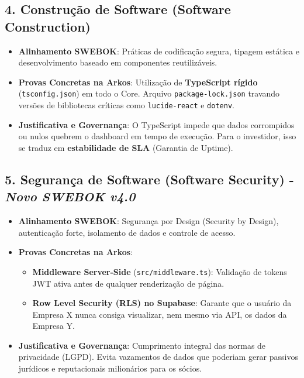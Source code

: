 \subsection{4. Construção de Software (Software Construction)}
\begin{itemize}
    \item \textbf{Alinhamento SWEBOK}: Práticas de codificação segura, tipagem estática e desenvolvimento baseado em componentes reutilizáveis.
    \item \textbf{Provas Concretas na Arkos}: Utilização de \textbf{TypeScript rígido} (\texttt{tsconfig.json}) em todo o Core. Arquivo \texttt{package-lock.json} travando versões de bibliotecas críticas como \texttt{lucide-react} e \texttt{dotenv}.
    \item \textbf{Justificativa e Governança}: O TypeScript impede que dados corrompidos ou nulos quebrem o dashboard em tempo de execução. Para o investidor, isso se traduz em \textbf{estabilidade de SLA} (Garantia de Uptime).
\end{itemize}

\subsection{5. Segurança de Software (Software Security) - \textit{Novo SWEBOK v4.0}}
\begin{itemize}
    \item \textbf{Alinhamento SWEBOK}: Segurança por Design (Security by Design), autenticação forte, isolamento de dados e controle de acesso.
    \item \textbf{Provas Concretas na Arkos}: 
        \begin{itemize}
            \item \textbf{Middleware Server-Side} (\texttt{src/middleware.ts}): Validação de tokens JWT ativa antes de qualquer renderização de página.
            \item \textbf{Row Level Security (RLS) no Supabase}: Garante que o usuário da Empresa X nunca consiga visualizar, nem mesmo via API, os dados da Empresa Y.
        \end{itemize}
    \item \textbf{Justificativa e Governança}: Cumprimento integral das normas de privacidade (LGPD). Evita vazamentos de dados que poderiam gerar passivos jurídicos e reputacionais milionários para os sócios.
\end{itemize}

\pagebreak


